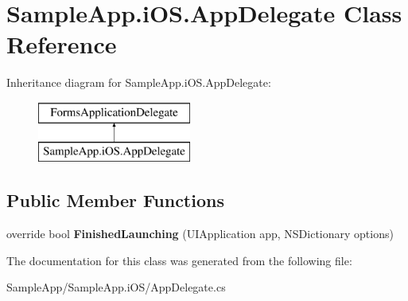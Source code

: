 \hypertarget{class_sample_app_1_1i_o_s_1_1_app_delegate}{}\section{Sample\+App.\+i\+O\+S.\+App\+Delegate Class Reference}
\label{class_sample_app_1_1i_o_s_1_1_app_delegate}
Inheritance diagram for Sample\+App.\+i\+O\+S.\+App\+Delegate\+:\begin{figure}[H]
\begin{center}
\leavevmode
\includegraphics[height=2.000000cm]{class_sample_app_1_1i_o_s_1_1_app_delegate}
\end{center}
\end{figure}
\subsection*{Public Member Functions}
\begin{DoxyCompactItemize}
\item 
\mbox{\label{class_sample_app_1_1i_o_s_1_1_app_delegate_ade3c9b1f0032f7fed6406f8e8d5cb678}} 
override bool {\bfseries Finished\+Launching} (U\+I\+Application app, N\+S\+Dictionary options)
\end{DoxyCompactItemize}


The documentation for this class was generated from the following file\+:\begin{DoxyCompactItemize}
\item 
Sample\+App/\+Sample\+App.\+i\+O\+S/App\+Delegate.\+cs\end{DoxyCompactItemize}
